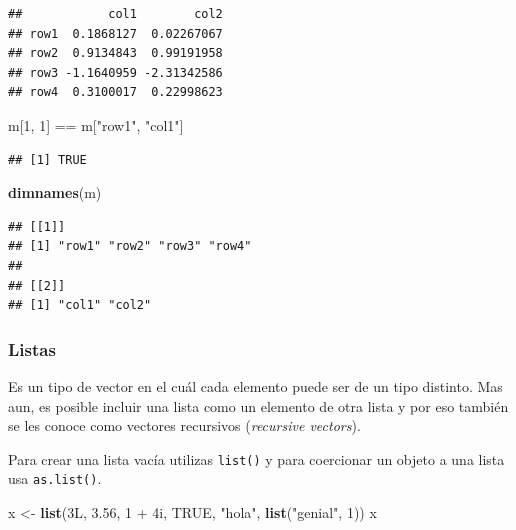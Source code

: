 \documentclass[]{article}
\newenvironment{Shaded}{\begin{snugshade}}{\end{snugshade}}
\newcommand{\KeywordTok}[1]{\textcolor[rgb]{0.13,0.29,0.53}{\textbf{{#1}}}}
\newcommand{\DecValTok}[1]{\textcolor[rgb]{0.00,0.00,0.81}{{#1}}}
\newcommand{\FloatTok}[1]{\textcolor[rgb]{0.00,0.00,0.81}{{#1}}}
\newcommand{\StringTok}[1]{\textcolor[rgb]{0.31,0.60,0.02}{{#1}}}
\newcommand{\OtherTok}[1]{\textcolor[rgb]{0.56,0.35,0.01}{{#1}}}
\newcommand{\NormalTok}[1]{{#1}}
\begin{document}
\begin{verbatim}
##            col1        col2
## row1  0.1868127  0.02267067
## row2  0.9134843  0.99191958
## row3 -1.1640959 -2.31342586
## row4  0.3100017  0.22998623
\end{verbatim}

\begin{Shaded}
\begin{Highlighting}[]
\NormalTok{m[}\DecValTok{1}\NormalTok{, }\DecValTok{1}\NormalTok{] ==}\StringTok{ }\NormalTok{m[}\StringTok{"row1"}\NormalTok{, }\StringTok{"col1"}\NormalTok{]}
\end{Highlighting}
\end{Shaded}

\begin{verbatim}
## [1] TRUE
\end{verbatim}

\begin{Shaded}
\begin{Highlighting}[]
\KeywordTok{dimnames}\NormalTok{(m)}
\end{Highlighting}
\end{Shaded}

\begin{verbatim}
## [[1]]
## [1] "row1" "row2" "row3" "row4"
## 
## [[2]]
## [1] "col1" "col2"
\end{verbatim}

\subsubsection{Listas}\label{listas}

Es un tipo de vector en el cuál cada elemento puede ser de un tipo
distinto. Mas aun, es posible incluir una lista como un elemento de otra
lista y por eso también se les conoce como vectores recursivos
(\emph{recursive vectors}).

Para crear una lista vacía utilizas \texttt{list()} y para coercionar un
objeto a una lista usa \texttt{as.list()}.

\begin{Shaded}
\begin{Highlighting}[]
\NormalTok{x <-}\StringTok{ }\KeywordTok{list}\NormalTok{(3L, }\FloatTok{3.56}\NormalTok{, }\DecValTok{1} \NormalTok{+}\StringTok{ }\NormalTok{4i, }\OtherTok{TRUE}\NormalTok{, }\StringTok{"hola"}\NormalTok{, }\KeywordTok{list}\NormalTok{(}\StringTok{"genial"}\NormalTok{, }\DecValTok{1}\NormalTok{))}
\NormalTok{x}
\end{Highlighting}
\end{Shaded}
\end{document}
